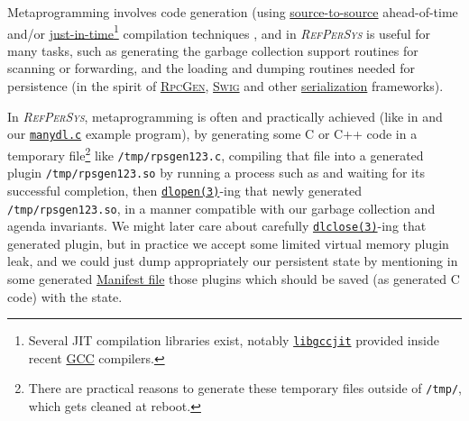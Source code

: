 \documentclass{IEEEtran}
\newcommand{\RefPerSys}{{\textit{\textsc{RefPerSys}}}}
\begin{document}
Metaprogramming involves code generation (using
\href{https://en.wikipedia.org/wiki/Source-to-source_compiler}{source-to-source}
ahead-of-time and/or
\href{https://en.wikipedia.org/wiki/Just-in-time_compilation}{just-in-time}\footnote{Several
JIT compilation libraries exist, notably
\href{https://gcc.gnu.org/onlinedocs/jit/}{\texttt{libgccjit}}
provided inside recent \href{http://gcc.gnu.org}{\textsc{GCC}}
compilers.} compilation techniques \cite{Aho:2006:dragon-book}, and in
     {\RefPerSys} is useful for many tasks, such as generating the
     garbage collection support routines for scanning or forwarding,
     and the loading and dumping routines needed for persistence (in
     the spirit of
     \href{https://en.wikipedia.org/wiki/RPCGEN}{\textsc{RpcGen}},
     \href{http://swig.org/}{\textsc{Swig}} and other
     \href{https://en.wikipedia.org/wiki/Serialization}{serialization}
     frameworks).

 In \RefPerSys, metaprogramming is often and practically achieved
 (like in \cite{Starynkevitch-DSL2011,
   Starynkevitch:2019:bismon-draft, Pitrat:1996:FGCS,
   Pitrat:2009:ArtifBeings} and our
 \href{https://github.com/bstarynk/misc-basile/blob/master/manydl.c}{\texttt{manydl.c}}
 example program), by generating some C or C++ code in a temporary
 file\footnote{There are practical reasons to generate these temporary
 files outside of \texttt{/tmp/}, which gets cleaned at reboot.} like
 \texttt{/tmp/rpsgen123.c}, compiling that file
 \cite{drepper:2011:write-shared-lib} into a generated plugin
 \texttt{/tmp/rpsgen123.so} by running a process such as
        {} and waiting for its successful
        completion, then
        \href{http://man7.org/linux/man-pages/man3/dlopen.3.html}{\texttt{dlopen(3)}}-ing
        that newly generated \texttt{/tmp/rpsgen123.so}, in a manner
        compatible with our garbage collection and agenda
        invariants. We might later care about carefully
        \href{http://man7.org/linux/man-pages/man3/dlclose.3.html}{\texttt{dlclose(3)}}-ing
        that generated plugin, but in practice we accept some limited
        virtual memory plugin leak, and we could just dump
        appropriately our persistent state by mentioning in some
        generated
        \href{https://en.wikipedia.org/wiki/Manifest_file}{Manifest
          file} those plugins which should be saved (as generated C
        code) with the state.
\end{document}
